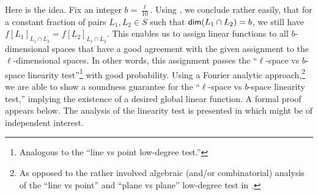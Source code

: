 \documentclass{toc}
\begin{document}
\smallskip
Here is the idea. Fix an integer $b = \frac{\ell}{10}$.
Using , we conclude rather easily, that for a 
constant fraction of
pairs $L_1, L_2 \in S$ such that  ${\sf dim} (L_1 \cap L_2) = b$, we still have  
$f[L_1]_{L_1 \cap L_2} = f[L_2]_{L_1 \cap L_2}$.
This enables us to assign linear functions to
all %
$b$-dimensional
spaces that have a good agreement with the given assignment to
the %
$\ell$-dimensional spaces.
In other words, this assignment passes
 the ``$\ell$-space vs $b$-space linearity test''\footnote{Analogous to the ``line vs point low-degree test.''}
with good probability. Using a Fourier analytic approach,\footnote{As opposed to
 the rather involved algebraic (and/or combinatorial) analysis of the ``line vs point'' and ``plane vs plane'' low-degree test in \cite{AS98, RS97}. }
we are able to show a soundness guarantee for the ``$\ell$-space vs $b$-space linearity test,''
implying the existence of a desired global linear function. A formal proof appears below.
The analysis of the linearity test is presented in  which might be of independent interest.


\smallskip
\end{document}
